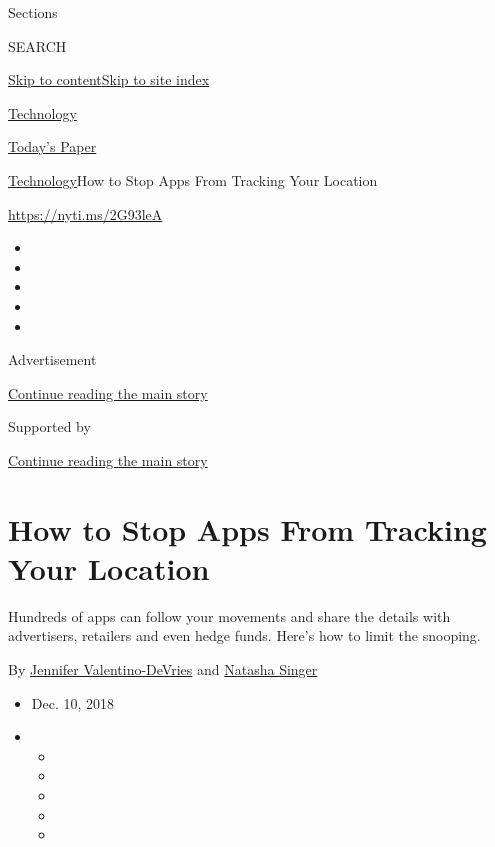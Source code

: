 Sections

SEARCH

\protect\hyperlink{site-content}{Skip to
content}\protect\hyperlink{site-index}{Skip to site index}

\href{https://www.nytimes.com/section/technology}{Technology}

\href{https://myaccount.nytimes.com/auth/login?response_type=cookie\&client_id=vi}{}

\href{https://www.nytimes.com/section/todayspaper}{Today's Paper}

\href{/section/technology}{Technology}\textbar{}How to Stop Apps From
Tracking Your Location

\url{https://nyti.ms/2G93leA}

\begin{itemize}
\item
\item
\item
\item
\item
\end{itemize}

Advertisement

\protect\hyperlink{after-top}{Continue reading the main story}

Supported by

\protect\hyperlink{after-sponsor}{Continue reading the main story}

\hypertarget{how-to-stop-apps-from-tracking-your-location}{%
\section{How to Stop Apps From Tracking Your
Location}\label{how-to-stop-apps-from-tracking-your-location}}

Hundreds of apps can follow your movements and share the details with
advertisers, retailers and even hedge funds. Here's how to limit the
snooping.

By \href{https://www.nytimes.com/by/jennifer-valentino-devries}{Jennifer
Valentino-DeVries} and
\href{https://www.nytimes.com/by/natasha-singer}{Natasha Singer}

\begin{itemize}
\item
  Dec. 10, 2018
\item
  \begin{itemize}
  \item
  \item
  \item
  \item
  \item
  \end{itemize}
\end{itemize}

